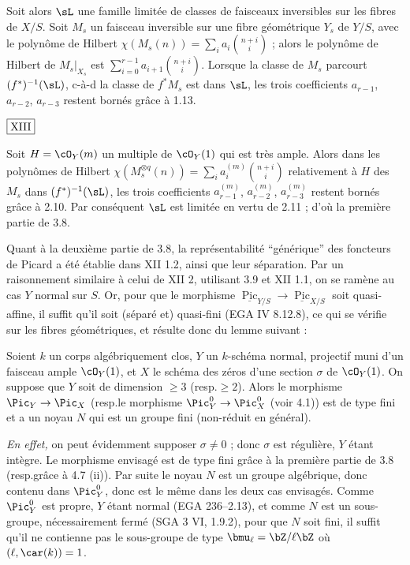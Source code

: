 Soit alors $\sL$ une famille limitée de classes de faisceaux inversibles sur les fibres de $X/S$. Soit $M_s$ un faisceau inversible sur une fibre géométrique $Y_s$ de $Y/S$, avec le polynôme de Hilbert $\chi(M_s(n)) = \sum_i a_i \binom{n+i}{i}$ ; alors le polynôme de Hilbert de $M_s|_{X_s}$ est $\sum_{i=0}^{r-1} a_{i+1} \binom{n+i}{i}$. Lorsque la classe de $M_s$ parcourt $(f^*)^{-1}(\sL)$, c-à-d la classe de $f^*M_s$ est dans $\sL$, les trois coefficients $a_{r-1}$, $a_{r-2}$, $a_{r-3}$ restent bornés grâce à 1.13.

\begin{flushright}
$\fbox{\text{XIII}}$
\end{flushright}

\noindent
Soit $H = \cO_Y(m)$ un multiple de $\cO_Y(1)$ qui est très ample. Alors dans les polynômes de Hilbert $\chi(M_s^{\otimes q}(n)) = \sum_i a_i^{(m)} \binom{n+i}{i}$ relativement à $H$ des $M_s$ dans $(f^*)^{-1}(\sL)$, les trois coefficients $a_{r-1}^{(m)}$, $a_{r-2}^{(m)}$, $a_{r-3}^{(m)}$ restent bornés grâce à 2.10. Par conséquent $\sL$ est limitée en vertu de 2.11 ; d'où la première partie de 3.8.

Quant à la deuxième partie de 3.8, la représentabilité ``générique'' des foncteurs de Picard a été établie dans XII 1.2, ainsi que leur séparation. Par un raisonnement similaire à celui de XII 2, utilisant 3.9 et XII 1.1, on se ramène au cas $Y$ normal sur $S$. Or, pour que le morphisme $\underline{\operatorname{Pic}}_{Y/S} \to \underline{\operatorname{Pic}}_{X/S}$ soit quasi-affine, il suffit qu'il soit (séparé et) quasi-fini (EGA IV 8.12.8), ce qui se vérifie sur les fibres géométriques, et résulte donc du lemme suivant :

\begin{lem}\label{lem:3.11} Soient $k$ un corps algébriquement clos, $Y$ un $k$-schéma normal, projectif muni d'un faisceau ample $\cO_Y(1)$, et $X$ le schéma des zéros d'une section $\sigma$ de $\cO_Y(1)$. On suppose que $Y$ soit de dimension $\geq 3$ (resp.\@ $\geq 2$). Alors le morphisme $\Pic_Y \to \Pic_X$ (resp.\@ le morphisme $\Pic^0_Y \to \Pic^0_X$ (voir 4.1)) est de type fini et a un noyau $N$ qui est un groupe fini (non-réduit en général).
\end{lem}

\noindent\textit{En effet,} on peut évidemment supposer $\sigma \neq 0$ ; donc $\sigma$ est régulière, $Y$ étant intègre. Le morphisme envisagé est de type fini grâce à la première partie de 3.8 (resp.\@ grâce à 4.7 (ii)). Par suite le noyau $N$ est un groupe algébrique, donc contenu dans $\Pic^0_Y$, donc est le même dans les deux cas envisagés. Comme $\Pic^0_Y$ est propre, $Y$ étant normal (EGA 236--2.13), et comme $N$ est un sous-groupe, nécessairement fermé (SGA 3 VI, 1.9.2), pour que $N$ soit fini, il suffit qu'il ne contienne pas le sous-groupe de type $\bmu_{\ell} = \bZ/\ell\bZ$ où $(\ell, \car(k)) = 1$.


